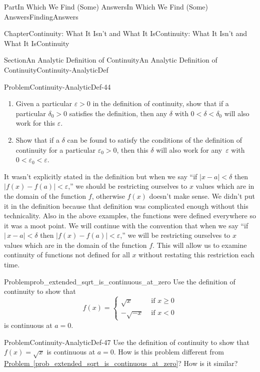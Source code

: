 \documentclass[oneside,10pt,]{book}
\newcommand{\xreffont}{\relax}
\numberwithin{equation}{part}
\newcommand{\abs}[1]{\left|#1\right|}
\newcommand{\eps}{\varepsilon}
\newcommand{\lt}{<}
\newcommand{\amp}{&}
\begin{document}
\begin{partptx}{Part}{In Which We Find (Some) Answers}{}{In Which We Find (Some) Answers}{}{}{FindingAnswers}
\begin{chapterptx}{Chapter}{Continuity: What It Isn't and What It Is}{}{Continuity: What It Isn't and What It Is}{}{}{Continuity}
\begin{sectionptx}{Section}{An Analytic Definition of Continuity}{}{An Analytic Definition of Continuity}{}{}{Continuity-AnalyticDef}
\begin{problem}{Problem}{}{Continuity-AnalyticDef-44}%
\begin{enumerate}[font=\bfseries,label=(\alph*),ref=\alph*]%
\item{}Given a particular \(\eps>0\) in the definition of continuity, show that if a particular \(\delta_0>0\) satisfies the definition, then any \(\delta\) with \(0\lt \delta\lt \delta_0\) will also work for this \(\eps\).%
\item{}Show that if a \(\delta\) can be found to satisfy the conditions of the definition of continuity for a particular \(\eps_0>0\), then this \(\delta\) will also work for any \(\,\eps\) with \(0\lt \eps_0\lt
\eps\).%
\end{enumerate}%
\end{problem}
It wasn't explicitly stated in the definition but when we say ``if \(\abs{x-a}\lt \delta\) then \(|f(x)-f(a)|\lt
\eps\),'' we should be restricting ourselves to \(x\) values which are in the domain of the function \(f\), otherwise \(f(x)\) doesn't make sense.  We didn't put it in the definition because that definition was complicated enough without this technicality.  Also in the above examples, the functions were defined everywhere so it was a moot point.  We will continue with the convention that when we say ``if \(|\,x-a|\lt \delta\) then \(|f(x)-f(a)|\lt \eps\),'' we will be restricting ourselves to \(x\) values which are in the domain of the function \(f\).  This will allow us to examine continuity of functions not defined for all \(x\) without restating this restriction each time.%
\begin{problem}{Problem}{}{prob_extended_sqrt_is_continuous_at_zero}%
 Use the definition of continuity to show that%
\begin{equation*}
f(x)= \begin{cases}\sqrt{x} \amp  \text{ if }  x\ge0\\ -\sqrt{-x} \amp  \text{ if }  x\lt 0 \end{cases}
\end{equation*}
is continuous at \(a=0\).%
\end{problem}
\begin{problem}{Problem}{}{Continuity-AnalyticDef-47}%
Use the definition of continuity to show that \(f(x)=
\sqrt{x}\) is continuous at \(a=0\).  How is this problem different from \hyperref[prob_extended_sqrt_is_continuous_at_zero]{Problem~{\xreffont\ref{prob_extended_sqrt_is_continuous_at_zero}}}?  How is it similar?%

\end{problem}
\end{sectionptx}
\end{chapterptx}
\end{partptx}
\end{document}

